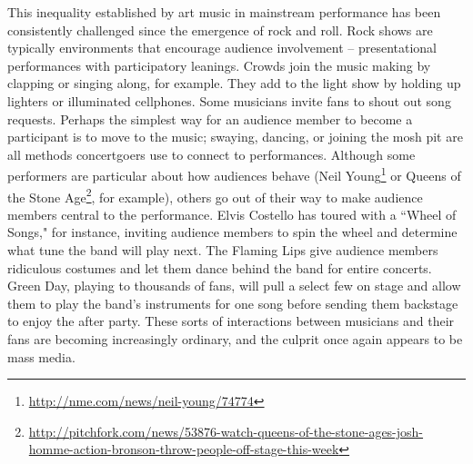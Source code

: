 This inequality established by art music in mainstream performance has been consistently challenged since the emergence of rock and roll. Rock shows are typically environments that encourage audience involvement -- presentational performances with participatory leanings. Crowds join the music making by clapping or singing along, for example. They add to the light show by holding up lighters or illuminated cellphones. Some musicians invite fans to shout out song requests. Perhaps the simplest way for an audience member to become a participant is to move to the music; swaying, dancing, or joining the mosh pit are all methods concertgoers use to connect to performances. Although some performers are particular about how audiences behave (Neil Young\footnote{\url{http://nme.com/news/neil-young/74774}} or Queens of the Stone Age\footnote{\url{http://pitchfork.com/news/53876-watch-queens-of-the-stone-ages-josh-homme-action-bronson-throw-people-off-stage-this-week}}, for example), others go out of their way to make audience members central to the performance. Elvis Costello has toured with a ``Wheel of Songs," for instance, inviting audience members to spin the wheel and determine what tune the band will play next. The Flaming Lips give audience members ridiculous costumes and let them dance behind the band for entire concerts. Green Day, playing to thousands of fans, will pull a select few on stage and allow them to play the band's instruments for one song before sending them backstage to enjoy the after party. These sorts of interactions between musicians and their fans are becoming increasingly ordinary, and the culprit once again appears to be mass media.

